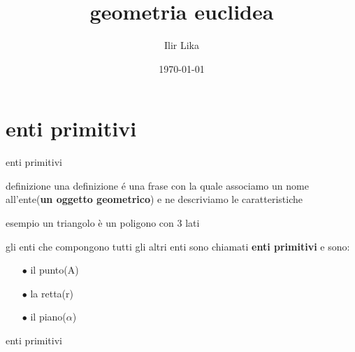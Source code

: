 \documentclass{beamer}
\title{geometria euclidea}
\author{Ilir Lika}
\institute{Istituto Maria Immacolata}
\date{\today}
\begin{document}
\frame{\titlepage}
\section{enti primitivi}
\begin{frame}{enti primitivi}
\begin{block}{definizione}
una definizione é una frase con la quale associamo un nome all'ente(\textbf{un oggetto geometrico}) e ne descriviamo le caratteristiche
\end{block}
\begin{exampleblock}{esempio}
un triangolo è un poligono con 3 lati
\end{exampleblock}
gli enti che compongono tutti gli altri enti sono chiamati \textbf{enti primitivi} e sono:
\begin{itemize}
    \item[$\bullet$] il punto(A)
    \item[$\bullet$] la retta(r)
    \item[$\bullet$] il piano($\alpha$)
\end{itemize}
\end{frame}
\begin{frame}{enti primitivi}

\end{frame}
\end{document}
